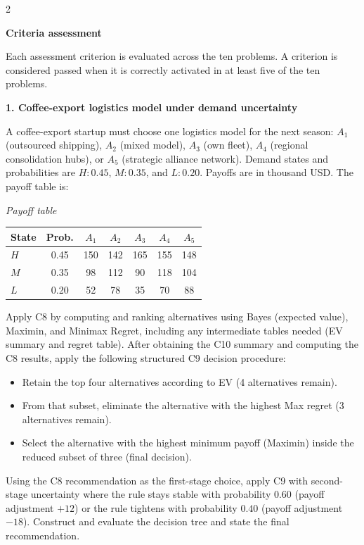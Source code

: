 \documentclass[12pt]{article}
\newcommand{\SubsectionBox}[1]{%
	\noindent\colorbox{gray!30}{%
		\parbox{\linewidth}{\textbf{#1}}%
	}\par\vspace{0.35cm}%
}
\begin{document}
	\begin{multicols}{2}
		\SubsectionBox{Criteria assessment}\vspace{-0.25cm}
		Each assessment criterion is evaluated across the ten problems. A criterion is considered passed when it is correctly activated in at least five of the ten problems.
		
		\vspace{0.25cm}
		\SubsectionBox{1. Coffee-export logistics model under demand uncertainty}\vspace{-0.25cm}
		A coffee-export startup must choose one logistics model for the next season: $A_1$ (outsourced shipping), $A_2$ (mixed model), $A_3$ (own fleet), $A_4$ (regional consolidation hubs), or $A_5$ (strategic alliance network).
		Demand states and probabilities are $H:0.45$, $M:0.35$, and $L:0.20$. Payoffs are in thousand USD. The payoff table is:
		
		\begin{center}
			\textit{Payoff table} \\
			\begin{tabular}{l c c c c c c}
				\hline
				State& Prob. & $A_1$ & $A_2$ & $A_3$ & $A_4$ & $A_5$ \\
				\hline
				$H$ & 0.45 & 150 & 142 & 165 & 155 & 148 \\
				$M$ & 0.35 & 98 & 112 & 90 & 118 & 104 \\
				$L$ & 0.20 & 52 & 78 & 35 & 70 & 88 \\
				\hline
			\end{tabular}
		\end{center}
		
		Apply C8 by computing and ranking alternatives using Bayes (expected value), Maximin, and Minimax Regret, including any intermediate tables needed (EV summary and regret table).
		After obtaining the C10 summary and computing the C8 results, apply the following structured C9 decision procedure:
		\begin{itemize}
			\item Retain the top four alternatives according to EV (4 alternatives remain).
			\item From that subset, eliminate the alternative with the highest Max regret (3 alternatives remain).
			\item Select the alternative with the highest minimum payoff (Maximin) inside the reduced subset of three (final decision).
		\end{itemize}
		Using the C8 recommendation as the first-stage choice, apply C9 with second-stage uncertainty where the rule stays stable with probability $0.60$ (payoff adjustment $+12$) or the rule tightens with probability $0.40$ (payoff adjustment $-18$). Construct and evaluate the decision tree and state the final recommendation.
		

\end{multicols}
\end{document}

